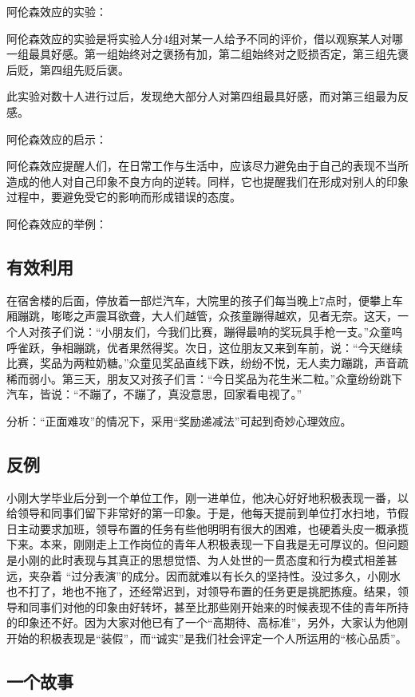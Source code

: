 \documentclass[11pt]{ctexart}
\begin{document}
阿伦森效应的实验：

阿伦森效应的实验是将实验人分4组对某一人给予不同的评价，借以观察某人对哪一组最具好感。第一组始终对之褒扬有加，第二组始终对之贬损否定，第三组先褒后贬，第四组先贬后褒。

此实验对数十人进行过后，发现绝大部分人对第四组最具好感，而对第三组最为反感。

阿伦森效应的启示：

阿伦森效应提醒人们，在日常工作与生活中，应该尽力避免由于自己的表现不当所造成的他人对自己印象不良方向的逆转。同样，它也提醒我们在形成对别人的印象过程中，要避免受它的影响而形成错误的态度。

阿伦森效应的举例：
\subsection{有效利用}
\label{sec-2-1}


在宿舍楼的后面，停放着一部烂汽车，大院里的孩子们每当晚上7点时，便攀上车厢蹦跳，嘭嘭之声震耳欲聋，大人们越管，众孩童蹦得越欢，见者无奈。这天，一个人对孩子们说：“小朋友们，今我们比赛，蹦得最响的奖玩具手枪一支。”众童呜呼雀跃，争相蹦跳，优者果然得奖。次日，这位朋友又来到车前，说：“今天继续比赛，奖品为两粒奶糖。”众童见奖品直线下跌，纷纷不悦，无人卖力蹦跳，声音疏稀而弱小。第三天，朋友又对孩子们言：“今日奖品为花生米二粒。”众童纷纷跳下汽车，皆说：“不蹦了，不蹦了，真没意思，回家看电视了。”

分析：“正面难攻”的情况下，采用“奖励递减法”可起到奇妙心理效应。
\subsection{反例}
\label{sec-2-2}


小刚大学毕业后分到一个单位工作，刚一进单位，他决心好好地积极表现一番，以给领导和同事们留下非常好的第一印象。于是，他每天提前到单位打水扫地，节假日主动要求加班，领导布置的任务有些他明明有很大的困难，也硬着头皮一概承揽下来。本来，刚刚走上工作岗位的青年人积极表现一下自我是无可厚议的。但问题是小刚的此时表现与其真正的思想觉悟、为人处世的一贯态度和行为模式相差甚远，夹杂着 “过分表演”的成分。因而就难以有长久的坚持性。没过多久，小刚水也不打了，地也不拖了，还经常迟到，对领导布置的任务更是挑肥拣瘦。结果，领导和同事们对他的印象由好转坏，甚至比那些刚开始来的时候表现不佳的青年所持的印象还不好。因为大家对他已有了一个“高期待、高标准”，另外，大家认为他刚开始的积极表现是“装假”，而“诚实”是我们社会评定一个人所运用的“核心品质”。
\subsection{一个故事}
\label{sec-2-3}
\end{document}
